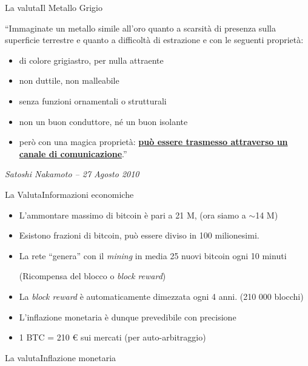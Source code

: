 \documentclass[english,compress]{beamer}
\begin{document}
\begin{frame}{La valuta}{Il Metallo Grigio}

\begin{small}``Immaginate un metallo simile all’oro quanto a scarsità di presenza
sulla superficie terrestre e quanto a difficoltà di estrazione e con le seguenti proprietà:

\begin{itemize}
 \item di colore grigiastro, per nulla attraente
 \item non duttile, non malleabile
 \item senza funzioni ornamentali o strutturali
 \item non un buon conduttore, né un buon isolante
 \smallskip
 \item però con una magica proprietà: \underline{\textbf{può essere trasmesso 
attraverso un canale di comunicazione}}.''
 \end{itemize}\end{small}
 \smallskip

\em{Satoshi Nakamoto -- 27 Agosto 2010}
\end{frame}

\begin{frame}{La Valuta}{Informazioni economiche}
 \begin{itemize}
  \item L'ammontare massimo di bitcoin è pari a 21 M, (ora siamo a $\sim$14 M)
  \item Esistono frazioni di bitcoin, può essere diviso in 100 milionesimi.
  \item La rete ``genera'' con il \emph{mining} in media 25 nuovi bitcoin ogni 10 minuti \begin{small}(Ricompensa del blocco o \emph{block reward})\end{small}
  \item La \emph{block reward} è automaticamente dimezzata ogni 4 anni. (210 000 blocchi)
  \item L'inflazione monetaria è dunque prevedibile con precisione
  \item 1 BTC = 210 € sui mercati (per auto-arbitraggio)
 \end{itemize}

\end{frame}

\begin{frame}{La valuta}{Inflazione monetaria}
\end{frame}
\end{document}
